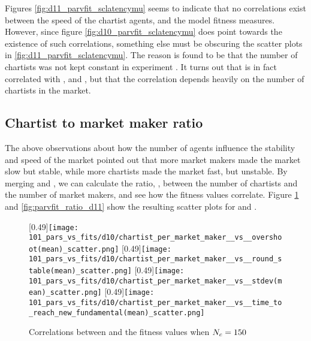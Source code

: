 Figures \ref{fig:d11_parvfit_sclatencymu} seems to indicate that no correlations exist between the speed of the chartist agents, and the model fitness measures. However, since figure \ref{fig:d10_parvfit_sclatencymu} does point towards the existence of such correlations, something else must be obscuring the scatter plots in \ref{fig:d11_parvfit_sclatencymu}. The reason is found to be that the number of chartists was not kept constant in experiment \deleven. It turns out that \sclatencymu{} is in fact correlated with \overshoot, \stdev and \timetoreachnewfundamental, but that the correlation depends heavily on the number of chartists in the market. 






\subsection{Chartist to market maker ratio}

The above observations about how the number of agents influence the stability and speed of the market pointed out that more market makers made the market slow but stable, while more chartists made the market fast, but unstable. By merging \datamatrixpar{\dten} and \datamatrixpar{\deleven}, we can calculate the ratio, \ratioagents, between the number of chartists and the number of market makers, and see how the fitness values correlate. Figure \ref{fig:parvfit_ratio_d10} and \ref{fig:parvfit_ratio_d11} show the resulting scatter plots for \dten{} and \deleven. 

\begin{figure}
	\centering
	\subcaptionbox{}
	[0.49\linewidth]{\texttt{[image: 101\_pars\_vs\_fits/d10/chartist\_per\_market\_maker\_\_vs\_\_overshoot(mean)\_scatter.png]}}
	\subcaptionbox{}
	[0.49\linewidth]{\texttt{[image: 101\_pars\_vs\_fits/d10/chartist\_per\_market\_maker\_\_vs\_\_round\_stable(mean)\_scatter.png]}}
	\vspace{0.5cm}
	\subcaptionbox{}
	[0.49\linewidth]{\texttt{[image: 101\_pars\_vs\_fits/d10/chartist\_per\_market\_maker\_\_vs\_\_stdev(mean)\_scatter.png]}}
	\subcaptionbox{}
	[0.49\linewidth]{\texttt{[image: 101\_pars\_vs\_fits/d10/chartist\_per\_market\_maker\_\_vs\_\_time\_to\_reach\_new\_fundamental(mean)\_scatter.png]}}
	\caption{Correlations between \ratioagents{} and the fitness values when $N_{c} = 150$}
	\label{fig:parvfit_ratio_d10}
\end{figure}

